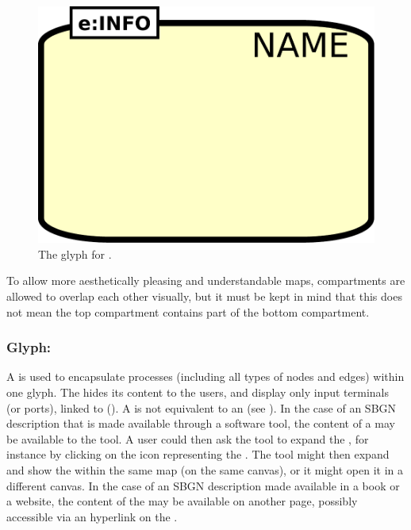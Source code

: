 \begin{figure}[htb]
  \centering
  \includegraphics[scale = 0.3]{le_images/compartment}
  \caption{The \PD glyph for .}
  \label{fig:compartment}
\end{figure}

To allow more aesthetically pleasing and understandable maps, compartments are allowed to overlap each other visually, but it must be kept in mind that this does not mean the top compartment contains part of the bottom compartment. 


%

\subsubsection{Glyph: }
\label{sec:submap}

A  is used to encapsulate processes (including all types of nodes and edges) within one glyph.  The  hides its content to the users, and display only input terminals (or ports), linked to  (). A  is not equivalent to an  (see ).  
In the case of an SBGN description that is made available through a software tool, the content of a  may be available to the tool.  A user could then ask the tool to expand the , for instance by clicking on the icon representing the .  The tool might then expand and show the  within the same map (on the same canvas), or it might open it in a different canvas. In the case of an SBGN description made available in a book or a website, the content of the  may be available on another page, possibly accessible via an hyperlink on the . 


